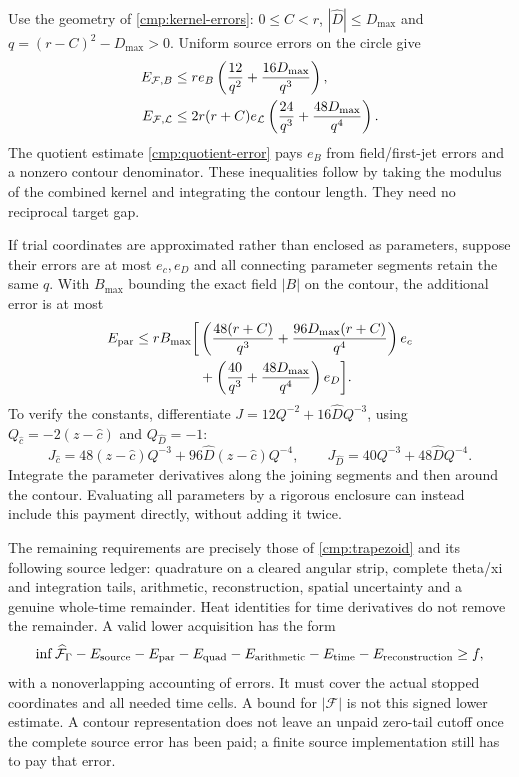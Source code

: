 Use the geometry of \eqref{cmp:kernel-errors}: $0\le C<r$,
$|\widehat D|\le D_{\max}$ and $q=(r-C)^2-D_{\max}>0$.
Uniform source errors on the circle give
\begin{align}
 E_{\mathcal F,B}
 &\le re_B\left(\frac{12}{q^2}+\frac{16D_{\max}}{q^3}\right),
       \notag\\
 E_{\mathcal F,\mathcal L}
 &\le2r(r+C)e_{\mathcal L}
       \left(\frac{24}{q^3}+\frac{48D_{\max}}{q^4}\right).
 \label{rf:source-errors}
\end{align}
The quotient estimate \eqref{cmp:quotient-error} pays $e_B$ from
field/first-jet errors and a nonzero contour denominator. These inequalities
follow by taking the modulus of the combined kernel and integrating the
contour length. They need no reciprocal target gap.

If trial coordinates are approximated rather than enclosed as parameters,
suppose their errors are at most $e_c,e_D$ and all connecting parameter
segments retain the same $q$. With $B_{\max}$ bounding the exact field
$|B|$ on the contour, the additional error is at most
\begin{equation}
 \begin{split}
 E_{\rm par}\le rB_{\max}\bigg[&
 \left(\frac{48(r+C)}{q^3}
             +\frac{96D_{\max}(r+C)}{q^4}\right)e_c\\
 &+\left(\frac{40}{q^3}+\frac{48D_{\max}}{q^4}\right)e_D\bigg].
 \end{split}
 \label{rf:parameter-error}
\end{equation}
To verify the constants, differentiate
$J=12Q^{-2}+16\widehat DQ^{-3}$, using
$Q_{\widehat c}=-2(z-\widehat c)$ and $Q_{\widehat D}=-1$:
\[
 J_{\widehat c}=48(z-\widehat c)Q^{-3}
                    +96\widehat D(z-\widehat c)Q^{-4},\qquad
 J_{\widehat D}=40Q^{-3}+48\widehat DQ^{-4}.
\]
Integrate the parameter derivatives along the joining segments and then
around the contour. Evaluating all parameters by a rigorous enclosure
can instead include this payment directly, without adding it twice.

The remaining requirements are precisely those of
\eqref{cmp:trapezoid} and its following source ledger: quadrature on a
cleared angular strip, complete theta/xi and integration tails, arithmetic,
reconstruction, spatial uncertainty and a genuine whole-time remainder.
Heat identities for time derivatives do not remove the remainder.
A valid lower acquisition has the form
\[
 \inf\widehat{\mathcal F}_\Gamma
 -E_{\rm source}-E_{\rm par}-E_{\rm quad}
 -E_{\rm arithmetic}-E_{\rm time}-E_{\rm reconstruction}\ge f,
\]
with a nonoverlapping accounting of errors. It must cover the actual
stopped coordinates and all needed time cells. A bound for
$|\mathcal F|$ is not this signed lower estimate. A contour representation
does not leave an unpaid zero-tail cutoff once the complete source error
has been paid; a finite source implementation still has to pay that error.

